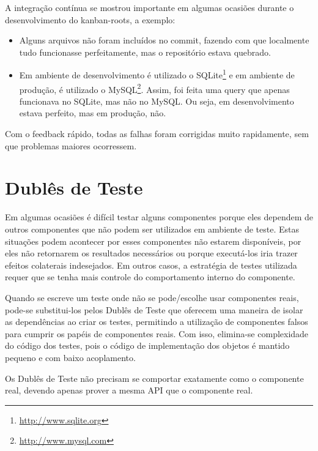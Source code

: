 A integração contínua se mostrou importante em algumas ocasiões durante o desenvolvimento do kanban-roots, a exemplo:

\begin{itemize}
  \item Alguns arquivos não foram incluídos no commit, fazendo com que localmente tudo funcionasse perfeitamente, mas o repositório estava quebrado.
  \item Em ambiente de desenvolvimento é utilizado o SQLite\footnote{\url{http://www.sqlite.org}} e em ambiente de produção, é utilizado o MySQL\footnote{\url{http://www.mysql.com}}. Assim, foi feita uma query que apenas funcionava no SQLite, mas não no MySQL. Ou seja, em desenvolvimento estava perfeito, mas em produção, não.
\end{itemize}

Com o feedback rápido, todas as falhas foram corrigidas muito rapidamente, sem que problemas maiores ocorressem.




\section{Dublês de Teste} %
\label{sec:dubles_de_teste}

Em algumas ocasiões é difícil testar alguns componentes porque eles dependem de outros componentes que não podem ser utilizados em ambiente de teste. Estas situações podem acontecer por esses componentes não estarem disponíveis, por eles não retornarem os resultados necessários ou porque executá-los iria trazer efeitos colaterais indesejados. Em outros casos, a estratégia de testes utilizada requer que se tenha mais controle do comportamento interno do componente.

Quando se escreve um teste onde não se pode/escolhe usar componentes reais, pode-se substitui-los pelos Dublês de Teste que oferecem uma maneira de isolar as dependências ao criar os testes, permitindo a utilização de componentes falsos para cumprir os papéis de componentes reais. Com isso, elimina-se complexidade do código dos testes, pois o código de implementação dos objetos é mantido pequeno e com baixo acoplamento.

Os Dublês de Teste não precisam se comportar exatamente como o componente real, devendo apenas prover a mesma API que o componente real.

